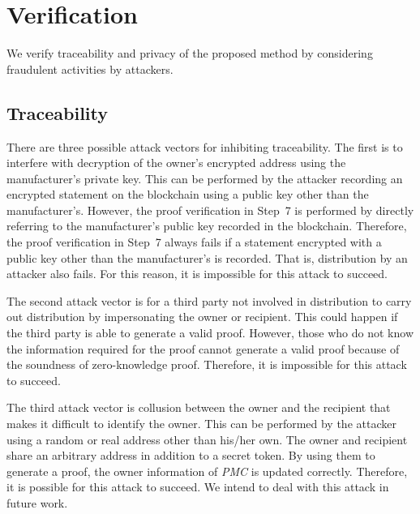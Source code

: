 \documentclass[conference]{IEEEtran}
\begin{document}
\section{Verification}
\label{sec:verification}
We verify traceability and privacy of the proposed method by considering fraudulent activities by attackers.


\subsection{Traceability}
There are three possible attack vectors for inhibiting traceability.
The first is to interfere with decryption of the owner's encrypted address using the manufacturer's private key.
This can be performed by the attacker recording an encrypted statement on the blockchain using a public key other than the manufacturer's.
However, the proof verification in Step~7 is performed by directly referring to the manufacturer's public key recorded in the blockchain.
Therefore, the proof verification in Step~7 always fails if a statement encrypted with a public key other than the manufacturer's is recorded.
That is, distribution by an attacker also fails.
For this reason, it is impossible for this attack to succeed.

The second attack vector is for a third party not involved in distribution to carry out distribution by impersonating the owner or recipient.
This could happen if the third party is able to generate a valid proof.
However, those who do not know the information required for the proof cannot generate a valid proof because of the soundness of zero-knowledge proof.
Therefore, it is impossible for this attack to succeed.

The third attack vector is collusion between the owner and the recipient that makes it difficult to identify the owner.
This can be performed by the attacker using a random or real address other than his/her own.
The owner and recipient share an arbitrary address in addition to a secret token.
By using them to generate a proof, the owner information of \textit{PMC} is updated correctly. 
Therefore, it is possible for this attack to succeed.
We intend to deal with this attack in future work.
\end{document}
